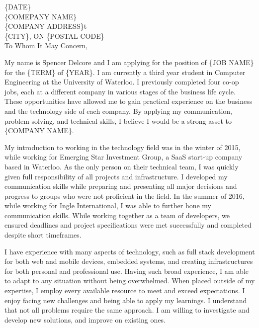 \documentclass{resume}
\begin{document}
\begin{rSection}{}\end{rSection}

\{DATE\}\\
\{COMEPANY NAME\} \\
\{COMPANY ADDRESS\}t\\
\{CITY\}, ON \{POSTAL CODE\}\\

To Whom It May Concern,
\par
\hspace{36pt}
My name is Spencer Delcore and I am applying for the position of {\{JOB NAME\}} for the \{TERM\} of \{YEAR\}. I am currently a third year student in Computer Engineering at the University of Waterloo. I previously completed four co-op jobs, each at a different company in various stages of the business life cycle. These opportunities have allowed me to gain practical experience on the business and the technology side of each company. By applying my communication, problem-solving, and technical skills, I believe I would be a strong asset to \{COMPANY NAME\}.

\hspace{36pt}
My introduction to working in the technology field was in the winter of 2015, while working for Emerging Star Investment Group, a SaaS start-up company based in Waterloo. As the only person on their technical team, I was quickly given full responsibility of all projects and infrastructure. I developed my communication skills while preparing and presenting all major decisions and progress to groups who were not proficient in the field. In the summer of 2016, while working for Ingle International, I was able to further hone my communication skills. While working together as a team of developers, we ensured deadlines and project specifications were met successfully and completed despite short timeframes.

\hspace{36pt}
I have experience with many aspects of technology, such as full stack development for both web and mobile devices, embedded systems, and creating infrastructures for both personal and professional use. Having such broad experience, I am able to adapt to any situation without being overwhelmed. When placed outside of my expertise, I employ every available resource to meet and exceed expectations. I enjoy facing new challenges and being able to apply my learnings. I understand that not all problems require the same approach. I am willing to investigate and develop new solutions, and improve on existing ones.
\end{document}
